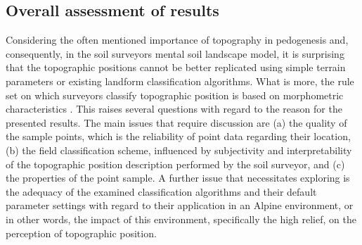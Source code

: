 \documentclass[preprint,12pt,authoryear]{elsarticle}
\begin{document}
\subsection{Overall assessment of results}
Considering the often mentioned importance of topography in pedogenesis and, consequently, in the soil surveyors mental soil landscape model, it is surprising that the topographic positions cannot be better replicated using simple terrain parameters or existing landform classification algorithms. What is more, the rule set on which surveyors classify topographic position is based on morphometric characteristics \citep{Englisch1998}. This raises several questions with regard to the reason for the presented results. The main issues that require discussion are (a) the quality of the sample points, which is the reliability of point data regarding their location, (b) the field classification scheme, influenced by subjectivity and interpretability of the topographic position description performed by the soil surveyor, and (c) the properties of the point sample. A further issue that necessitates exploring is the adequacy of the examined classification algorithms and their default parameter settings with regard to their application in an Alpine environment, or in other words, the impact of this environment, specifically the high relief, on the perception of topographic position. 
\end{document}
